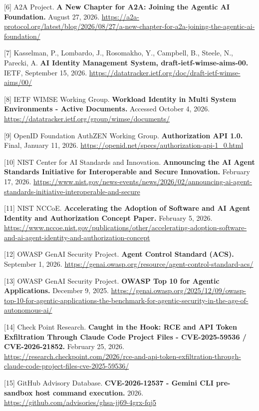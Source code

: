 \documentclass[
  10pt,
  letterpaper,
]{article}
\begin{document}
{[}6{]} A2A Project. \textbf{A New Chapter for A2A: Joining the Agentic
AI Foundation.} August 27, 2026.
\url{https://a2a-protocol.org/latest/blog/2026/08/27/a-new-chapter-for-a2a-joining-the-agentic-ai-foundation/}

{[}7{]} Kasselman, P., Lombardo, J., Rosomakho, Y., Campbell, B.,
Steele, N., Parecki, A. \textbf{AI Identity Management System,
draft-ietf-wimse-aims-00.} IETF, September 15, 2026.
\url{https://datatracker.ietf.org/doc/draft-ietf-wimse-aims/00/}

{[}8{]} IETF WIMSE Working Group. \textbf{Workload Identity in Multi
System Environments - Active Documents.} Accessed October 4, 2026.
\url{https://datatracker.ietf.org/group/wimse/documents/}

{[}9{]} OpenID Foundation AuthZEN Working Group. \textbf{Authorization
API 1.0.} Final, January 11, 2026.
\url{https://openid.net/specs/authorization-api-1_0.html}

{[}10{]} NIST Center for AI Standards and Innovation. \textbf{Announcing
the AI Agent Standards Initiative for Interoperable and Secure
Innovation.} February 17, 2026.
\url{https://www.nist.gov/news-events/news/2026/02/announcing-ai-agent-standards-initiative-interoperable-and-secure}

{[}11{]} NIST NCCoE. \textbf{Accelerating the Adoption of Software and
AI Agent Identity and Authorization Concept Paper.} February 5, 2026.
\url{https://www.nccoe.nist.gov/publications/other/accelerating-adoption-software-and-ai-agent-identity-and-authorization-concept}

{[}12{]} OWASP GenAI Security Project. \textbf{Agent Control Standard
(ACS).} September 1, 2026.
\url{https://genai.owasp.org/resource/agent-control-standard-acs/}

{[}13{]} OWASP GenAI Security Project. \textbf{OWASP Top 10 for Agentic
Applications.} December 9, 2025.
\url{https://genai.owasp.org/2025/12/09/owasp-top-10-for-agentic-applications-the-benchmark-for-agentic-security-in-the-age-of-autonomous-ai/}

{[}14{]} Check Point Research. \textbf{Caught in the Hook: RCE and API
Token Exfiltration Through Claude Code Project Files - CVE-2025-59536 /
CVE-2026-21852.} February 25, 2026.
\url{https://research.checkpoint.com/2026/rce-and-api-token-exfiltration-through-claude-code-project-files-cve-2025-59536/}

{[}15{]} GitHub Advisory Database. \textbf{CVE-2026-12537 - Gemini CLI
pre-sandbox host command execution.} 2026.
\url{https://github.com/advisories/ghsa-jj69-4grx-fqj5}
\end{document}
